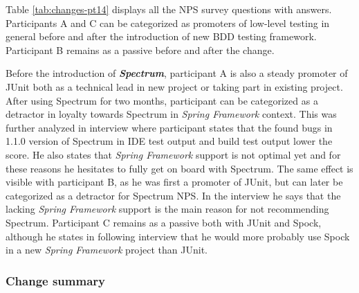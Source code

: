 Table \ref{tab:changes-pt14} displays all the NPS survey questions with answers.
Participants A and C can be categorized as promoters of low-level testing
in general before and after the introduction of new BDD testing framework. Participant B remains as a
passive before and after the change.

Before the introduction of \textbf{\textit{Spectrum}}, participant A
is also a steady promoter of JUnit both as a technical lead in new project or taking part in existing project. After
using Spectrum for two months, participant can be categorized as a detractor in loyalty towards Spectrum in \textit{Spring Framework} context.
This was further
analyzed in interview where participant states that the found bugs in 1.1.0 version of Spectrum in IDE test output and build test output
lower the score. He also states that \textit{Spring Framework} support is not optimal yet and for these reasons he hesitates
to fully get on board with Spectrum.
The same effect is visible with participant B, as he was first a promoter of JUnit, but can later be categorized as a detractor for Spectrum NPS.
In the interview he says that the lacking \textit{Spring Framework} support is the main reason for not recommending Spectrum.
Participant C remains as a passive both with JUnit and Spock, although he states in following interview that he would more
probably use Spock in a new \textit{Spring Framework} project than JUnit.

\subsubsection{Change summary}


